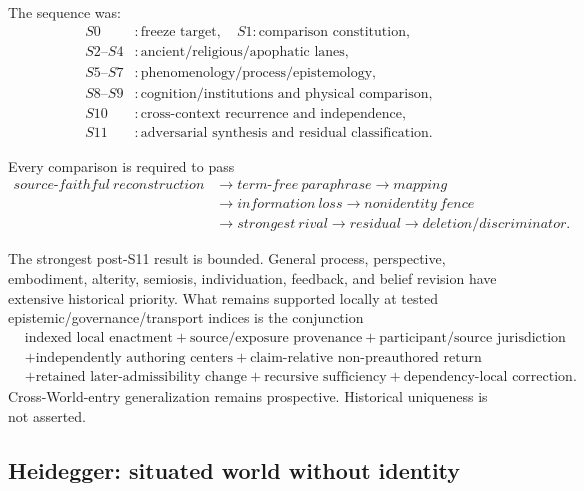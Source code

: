 \documentclass[11pt]{article}
\begin{document}
The sequence was:
\begin{equation}
\begin{aligned}
S0&:\text{freeze target},\quad
S1:\text{comparison constitution},\\
S2\text{--}S4&:\text{ancient/religious/apophatic lanes},\\
S5\text{--}S7&:\text{phenomenology/process/epistemology},\\
S8\text{--}S9&:\text{cognition/institutions and physical comparison},\\
S10&:\text{cross-context recurrence and independence},\\
S11&:\text{adversarial synthesis and residual classification}.
\end{aligned}
\end{equation}

Every comparison is required to pass
\begin{equation}
\begin{aligned}
source\text{-}faithful\ reconstruction
&\rightarrow term\text{-}free\ paraphrase
\rightarrow mapping\\
&\rightarrow information\ loss
\rightarrow nonidentity\ fence\\
&\rightarrow strongest\ rival
\rightarrow residual
\rightarrow deletion/discriminator.
\end{aligned}
\end{equation}

The strongest post-S11 result is bounded. General process, perspective, embodiment, alterity, semiosis, individuation, feedback, and belief revision have extensive historical priority. What remains supported locally at tested epistemic/governance/transport indices is the conjunction
\begin{equation}
\begin{aligned}
&\text{indexed local enactment}
+\text{source/exposure provenance}
+\text{participant/source jurisdiction}\\
&+\text{independently authoring centers}
+\text{claim-relative non-preauthored return}\\
&+\text{retained later-admissibility change}
+\text{recursive sufficiency}
+\text{dependency-local correction}.
\end{aligned}
\label{eq:s11-residual}
\end{equation}
Cross-World-entry generalization remains prospective. Historical uniqueness is not asserted.

\subsection{Heidegger: situated world without identity}
\end{document}
